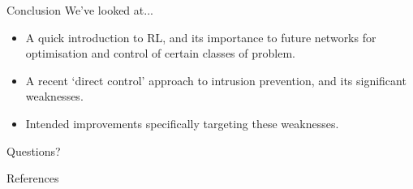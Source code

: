 \documentclass[aspectratio=169,xcolor={dvipsnames}
,hide notes
]{beamer}
\begin{document}
\begin{frame}[standout]{Conclusion}
	We've looked at...
	\begin{itemize}
		\item A quick introduction to RL, and its \alert{importance to future networks} for optimisation and control of certain classes of problem.
		\item A recent `direct control' approach to intrusion prevention, and \alert{its significant weaknesses}.
		\item \alert{Intended improvements} specifically targeting these weaknesses.
	\end{itemize}
	
	\alert{Questions?}
\end{frame}

\appendix

\begin{frame}[allowframebreaks]{References}
\printbibliography[heading=none]
\end{frame}
\end{document}
